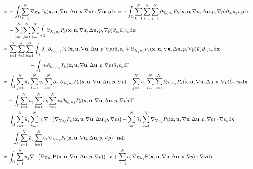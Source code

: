 \documentclass[oneside,11pt]{book}
\numberwithin{equation}{section}
\begin{document}
\begin{enumerate}[leftmargin=0in]
\begin{align*}
        =&\, -\int_\Omega \sum_{k=1}^N \nabla_{\nabla{\bf u}}P_k({\bf x},{\bf u},\nabla{\bf u},\Delta{\bf u},p,\nabla p):\nabla\tilde{\bf u}v_k{\rm d}{\bf x} = -\int_\Omega \sum_{k=1}^N\sum_{i=1}^N\sum_{j=1}^N \partial_{\partial_{x_i}u_j}P_k({\bf x},{\bf u},\nabla{\bf u},\Delta{\bf u},p,\nabla p)\partial_{x_i}\tilde{u}_jv_k{\rm d}{\bf x}\\
        =&\, -\sum_{i=1}^N\sum_{j=1}^N\sum_{k=1}^N \int_\Omega \partial_{\partial_{x_i}u_j}P_k({\bf x},{\bf u},\nabla{\bf u},\Delta{\bf u},p,\nabla p)\partial_{x_i}\tilde{u}_jv_k{\rm d}{\bf x}\\
        =&\, \sum_{i=1}^N\sum_{j=1}^N\sum_{k=1}^N \int_\Omega \partial_{x_i}\partial_{\partial_{x_i}u_j}P_k({\bf x},{\bf u},\nabla{\bf u},\Delta{\bf u},p,\nabla p)\tilde{u}_jv_k + \partial_{\partial_{x_i}u_j}P_k({\bf x},{\bf u},\nabla{\bf u},\Delta{\bf u},p,\nabla p)\tilde{u}_j\partial_{x_i}v_k{\rm d}{\bf x}\\
        &\hspace{15mm} -\int_\Gamma n_i\partial_{\partial_{x_i}u_j}P_k({\bf x},{\bf u},\nabla{\bf u},\Delta{\bf u},p,\nabla p)\tilde{u}_jv_k{\rm d}\Gamma\\
        =&\, \int_\Omega \sum_{j=1}^N \tilde{u}_j\sum_{k=1}^N v_k\sum_{i=1}^N \partial_{x_i}\partial_{\partial_{x_i}u_j}P_k({\bf x},{\bf u},\nabla{\bf u},\Delta{\bf u},p,\nabla p) + \sum_{j=1}^N \tilde{u}_j\sum_{k=1}^N\sum_{i=1}^N \partial_{\partial_{x_i}u_j}P_k({\bf x},{\bf u},\nabla{\bf u},\Delta{\bf u},p,\nabla p)\partial_{x_i}v_k{\rm d}{\bf x}\\
        & -\int_\Gamma \sum_{j=1}^N \tilde{u}_j\sum_{k=1}^N v_k\sum_{i=1}^N n_i\partial_{\partial_{x_i}u_j}P_k({\bf x},{\bf u},\nabla{\bf u},\Delta{\bf u},p,\nabla p){\rm d}\Gamma\\
        =&\, \int_\Omega \sum_{j=1}^N \tilde{u}_j\sum_{k=1}^N v_k\nabla\cdot\left(\nabla_{\nabla u_j}P_k({\bf x},{\bf u},\nabla{\bf u},\Delta{\bf u},p,\nabla p)\right) + \sum_{j=1}^N \tilde{u}_j\sum_{k=1}^N \nabla_{\nabla u_j}P_k({\bf x},{\bf u},\nabla{\bf u},\Delta{\bf u},p,\nabla p)\cdot\nabla v_k{\rm d}{\bf x}\\
        & -\int_\Gamma \sum_{j=1}^N \tilde{u}_j\sum_{k=1}^N v_k\nabla_{\nabla u_j}P_k({\bf x},{\bf u},\nabla{\bf u},\Delta{\bf u},p,\nabla p)\cdot{\bf n}{\rm d}\Gamma\\
        =&\, \int_\Omega \sum_{j=1}^N \tilde{u}_j\nabla\cdot\left(\nabla_{\nabla u_j}{\bf P}({\bf x},{\bf u},\nabla{\bf u},\Delta{\bf u},p,\nabla p)\right)\cdot{\bf v} + \sum_{j=1}^N \tilde{u}_j\nabla_{\nabla u_j}{\bf P}({\bf x},{\bf u},\nabla{\bf u},\Delta{\bf u},p,\nabla p):\nabla{\bf v}{\rm d}{\bf x}\\

\end{align*}
\end{enumerate}
\end{document}
